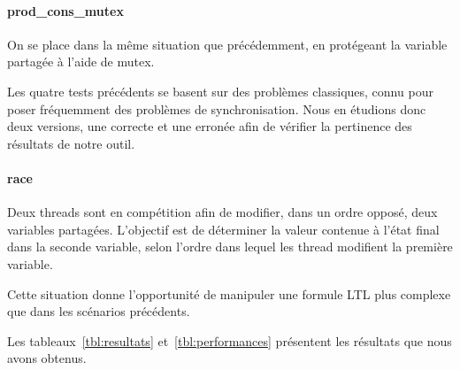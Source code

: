 \paragraph{prod\_cons\_mutex}
On se place dans la même situation que précédemment, en protégeant la variable
partagée à l'aide de mutex.

Les quatre tests précédents se basent sur des problèmes classiques, connu pour
poser fréquemment des problèmes de synchronisation. Nous en étudions donc deux
versions, une correcte et une erronée afin de vérifier la pertinence des
résultats de notre outil.

\paragraph{race}
Deux threads sont en compétition afin de modifier, dans un ordre opposé, deux
variables partagées. L'objectif est de déterminer la valeur contenue à l'état
final dans la seconde variable, selon l'ordre dans lequel les thread modifient
la première variable.

Cette situation donne l'opportunité de manipuler
une formule LTL plus complexe que dans les scénarios précédents.

Les tableaux~\ref{tbl:resultats} et~\ref{tbl:performances} présentent les
résultats que nous avons obtenus.

